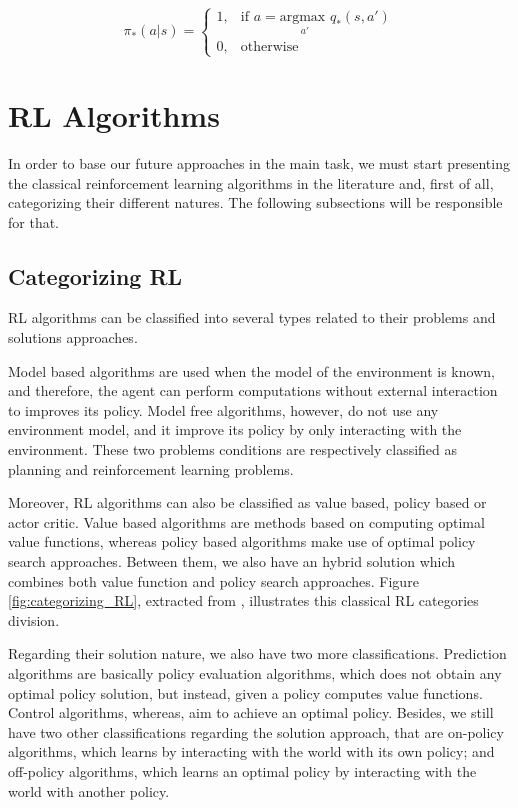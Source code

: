 \begin{equation}
 \pi_*(a | s) = 
\begin{cases}
    1,& \text{if } a = \underset{a'}{\textrm{argmax }} q_*(s,a')\\
    0,& \text{otherwise}
\end{cases}
\label{eq:policy_from_greedy}
\end{equation}

\section{RL Algorithms}

In order to base our future approaches in the main task, we must start presenting the classical reinforcement learning algorithms in the literature and, first of all, categorizing their different natures. The following subsections will be responsible for that.

\subsection{Categorizing RL}

RL algorithms can be classified into several types related to their problems and solutions approaches.


Model based algorithms are used when the model of the environment is known, and therefore, the agent can perform computations without external interaction to improves its policy. Model free algorithms, however, do not use any environment model, and it improve its policy by only interacting with the environment. These two problems conditions are respectively classified as planning and reinforcement learning problems.

Moreover, RL algorithms can also be classified as value based, policy based or actor critic. Value based algorithms are methods based on computing optimal value functions, whereas policy based algorithms make use of optimal policy search approaches. Between them, we also have an hybrid solution which combines both value function and policy search approaches. Figure \ref{fig:categorizing_RL}, extracted from \cite{lecture1DS}, illustrates this classical RL categories division.

Regarding their solution nature, we also have two more classifications. Prediction algorithms are basically policy evaluation algorithms, which does not obtain any optimal policy solution, but instead, given a policy computes value functions. Control algorithms, whereas, aim to achieve an optimal policy. Besides, we still have two other classifications regarding the solution approach, that are on-policy algorithms, which learns by interacting with the world with its own policy; and off-policy algorithms, which learns an optimal policy by interacting with the world with another policy.

